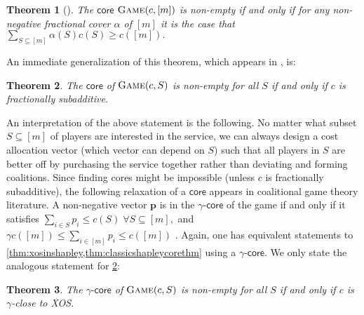 \documentclass[11pt]{article}%
\newtheorem{theorem}{Theorem}
\numberwithin{theorem}{subsection}
\newcommand{\game}{\textsc{Game}}
\newcommand{\core}{{\mathsf{core}}}
\newcommand{\gammacore}{\gamma\text{-}\mathsf{core}}
\begin{document}
\begin{theorem}[\cite{Bondareva63,Shapley67}]
\label{thm:classicshapleycorethm}
The $\core$ $\game(c,[m])$ is non-empty if and only if for any non-negative fractional cover $\alpha$ of $[m]$ it is the case that $\sum_{S\subseteq[m]}\alpha(S)c(S) \ge c([m]).$
\end{theorem}

\noindent
An immediate generalization of this theorem, which appears in \cite[Section 1.1]{Feige09}, is:

\noindent
\begin{theorem}
\label{thm:xosinshapley}
The $\core$ of $\game(c,S)$ is non-empty for all $S$ if and only if $c$ is fractionally subadditive.
\end{theorem}

An interpretation of the above statement is the following. No matter what subset $S\subseteq [m]$ of players are interested in the service, we can always design a cost allocation vector (which vector can depend on $S$) such that all players in $S$ are better off by purchasing the service together rather than deviating and forming coalitions.
Since finding cores might be impossible (unless $c$ is fractionally subadditive), the following
relaxation of a $\core$ appears in coalitional game theory literature. A non-negative vector $\mathbf{p}$ is in the $\gammacore$ of the game if and only if it satisfies $\sum_{i\in S}p_i \le c(S) \; \forall S\subseteq [m],$ and $\gamma c([m])\le \sum_{i\in [m]}p_i \le c([m])$ \cite[Definition 15.7]{AGTbook}.
Again, one has equivalent statements to \cref{thm:xosinshapley,thm:classicshapleycorethm} using a $\gammacore.$ We only state the analogous statement for \cref{thm:xosinshapley}:

\begin{theorem}
\label{thm:classicshapleygammacore}
The $\gammacore$ of $\game(c,S)$ is non-empty for all $S$ if and only if $c$ is $\gamma$-close to XOS.
\end{theorem}
\end{document}

